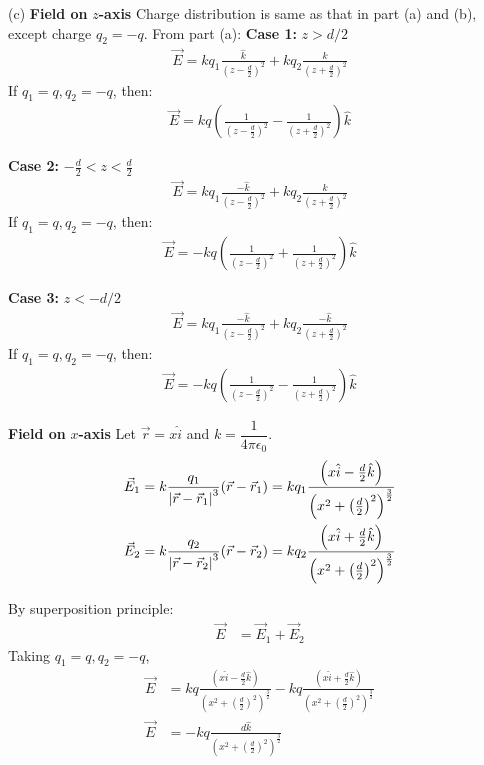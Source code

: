 \documentclass[12pt]{article}
\providecommand{\brak}[1]{\ensuremath{\left(#1\right)}}
\begin{document}
(c) \textbf{Field on} $z$\textbf{-axis}
\newline
Charge distribution is same as that in part (a) and (b), except charge $q_2 = -q$.
From part (a):
\newline
\textbf{Case 1:} $z > d/2$
\begin{align*}
\vec{E} = k q_1 \frac{\hat{k}}{\brak{z - \frac{d}{2}}^2} + k q_2 \frac{\hat{k}}{\brak{z + \frac{d}{2}}^2}
\end{align*}
If $q_1 = q, q_2 = -q$, then:
\begin{align*}
\vec{E} = k q \brak{\frac{1}{\brak{z - \frac{d}{2}}^2} - \frac{1}{\brak{z + \frac{d}{2}}^2}} \hat{k}
\end{align*}

\textbf{Case 2:} $-\frac{d}{2} < z < \frac{d}{2}$
\begin{align*}
\vec{E} = k q_1 \frac{-\hat{k}}{\brak{z - \frac{d}{2}}^2} + k q_2 \frac{\hat{k}}{\brak{z + \frac{d}{2}}^2}
\end{align*}
If $q_1 = q, q_2 = -q$, then:
\begin{align*}
\vec{E} = -kq \brak{\frac{1}{\brak{z - \frac{d}{2}}^2} + \frac{1}{\brak{z + \frac{d}{2}}^2}} \hat{k}
\end{align*}

\textbf{Case 3:} $z < -d/2$
\begin{align*}
\vec{E} = k q_1 \frac{-\hat{k}}{\brak{z - \frac{d}{2}}^2} + k q_2 \frac{-\hat{k}}{\brak{z + \frac{d}{2}}^2}
\end{align*}
If $q_1 = q, q_2 = -q$, then:
\begin{align*}
\vec{E} = -k q \brak{\frac{1}{\brak{z - \frac{d}{2}}^2} - \frac{1}{\brak{z + \frac{d}{2}}^2}} \hat{k}
\end{align*}

\textbf{Field on} $x$\textbf{-axis}
\newline
Let $\vec{r} = x \hat{i}$ and $k = \dfrac{1}{4 \pi \epsilon_0}$.
\begin{align*}
    \vec{E}_1 = k \frac{q_1}{\abs{\vec{r} - \vec{r}_1}^3} (\vec{r} - \vec{r}_1) = k q_1\frac{\brak{x\hat{i} - \frac{d}{2}\hat{k}}}{\brak{x^2 + \brak{\frac{d}{2}}^2}^\frac{3}{2}}\\
    \vec{E}_2 = k \frac{q_2}{\abs{\vec{r} - \vec{r}_2}^3} (\vec{r} - \vec{r}_2) = k q_2\frac{\brak{x\hat{i} + \frac{d}{2}\hat{k}}}{\brak{x^2 + \brak{\frac{d}{2}}^2}^\frac{3}{2}}
\end{align*}

By superposition principle:
\begin{align*}
    \vec{E} &= \vec{E}_1 + \vec{E}_2
\end{align*}
Taking $q_1 = q, q_2 = -q$,
\begin{align*}
    \vec{E} &= kq\frac{\brak{x\hat{i} - \frac{d}{2}\hat{k}}}{\brak{x^2 + \brak{\frac{d}{2}}^2}^\frac{3}{2}} - kq\frac{\brak{x\hat{i} + \frac{d}{2}\hat{k}}}{\brak{x^2 + \brak{\frac{d}{2}}^2}^\frac{3}{2}}\\
    \vec{E} &= -kq \frac{d\hat{k}}{\brak{x^2 + \brak{\frac{d}{2}}^2}^\frac{3}{2}}
\end{align*}
\end{document}

